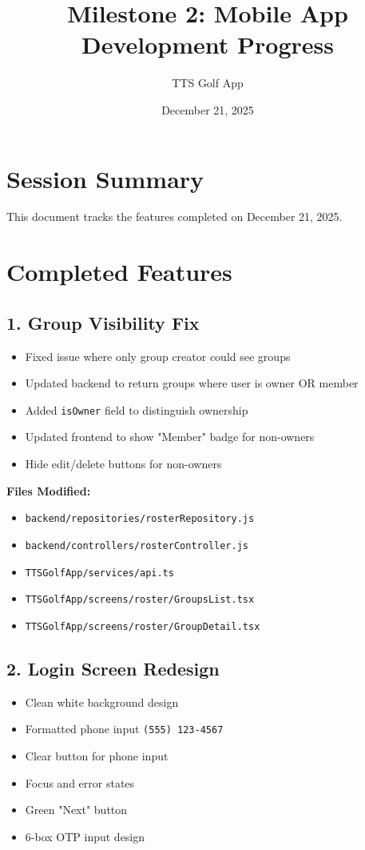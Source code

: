 \documentclass[11pt,a4paper]{article}
\title{\textbf{Milestone 2: Mobile App Development Progress}}
\author{TTS Golf App}
\date{December 21, 2025}
\newcommand{\done}{\textcolor{checkgreen}{$\checkmark$}}
\begin{document}
\maketitle

\section*{Session Summary}
This document tracks the features completed on December 21, 2025.

\section{Completed Features}

\subsection{1. Group Visibility Fix}
\begin{itemize}[label=\done]
    \item Fixed issue where only group creator could see groups
    \item Updated backend to return groups where user is owner OR member
    \item Added \texttt{isOwner} field to distinguish ownership
    \item Updated frontend to show "Member" badge for non-owners
    \item Hide edit/delete buttons for non-owners
\end{itemize}

\textbf{Files Modified:}
\begin{itemize}
    \item \texttt{backend/repositories/rosterRepository.js}
    \item \texttt{backend/controllers/rosterController.js}
    \item \texttt{TTSGolfApp/services/api.ts}
    \item \texttt{TTSGolfApp/screens/roster/GroupsList.tsx}
    \item \texttt{TTSGolfApp/screens/roster/GroupDetail.tsx}
\end{itemize}

\subsection{2. Login Screen Redesign}
\begin{itemize}[label=\done]
    \item Clean white background design
    \item Formatted phone input \texttt{(555) 123-4567}
    \item Clear button for phone input
    \item Focus and error states
    \item Green "Next" button
    \item 6-box OTP input design
\end{itemize}
\end{document}
